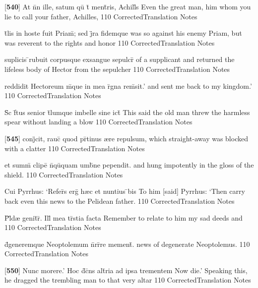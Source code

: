 \latline
  {[\textbf{540}] At n\={}n ille, satum qu\={} t\={} ment\={\macron {\i}}ris, Achill\={}s}
  { Even the great man, him whom you lie to call your father, Achilles, }
  {110}
  { CorrectedTranslation }
  { Notes }


\latline
  {t\={}lis in hoste fuit Priam\={}; sed j\={}ra fidemque}
  { was so against his enemy Priam, but was reverent to the rights and honor }
  {110}
  { CorrectedTranslation }
  { Notes }


\latline
  {suplicis \={}rubuit corpusque exsangue sepulcr\={}}
  { of a supplicant and returned the lifeless body of Hector from the sepulcher }
  {110}
  { CorrectedTranslation }
  { Notes }


\latline
  {reddidit Hectoreum m\={}que in mea r\={}gna rem\={\macron {\i}}sit.'}
  { and sent me back to my kingdom.' }
  {110}
  { CorrectedTranslation }
  { Notes }


\latline
  {S\={\macron {\i}}c f\={}tus senior t\={}lumque imbelle sine ict\={}}
  { This said the old man threw the harmless spear without landing a blow }
  {110}
  { CorrectedTranslation }
  { Notes }


\latline
  {[\textbf{545}] conj\={}cit, rauc\={} quod pr\={}tinus {\ae}re repulsum,}
  { which straight-away was blocked with a clatter  }
  {110}
  { CorrectedTranslation }
  { Notes }


\latline
  {et summ\={} clipe\={\macron {\i}} n\={}qu\={\macron {\i}}quam umb\={}ne pependit.}
  { and hung impotently in the gloss of the shield. }
  {110}
  { CorrectedTranslation }
  { Notes }


\latline
  {Cui Pyrrhus: `Refer\={}s erg\={} h{\ae}c et nuntius \={\macron {\i}}bis}
  { To him [said] Pyrrhus: `Then carry back even this news to the Pelidean father. }
  {110}
  { CorrectedTranslation }
  { Notes }


\latline
  {P\={}l\={\macron {\i}}d{\ae} genit\={}r\={\macron {\i}}.  Ill\={\macron {\i}} mea tr\={\macron {\i}}stia facta}
  { Remember to relate to him my sad deeds and  }
  {110}
  { CorrectedTranslation }
  { Notes }


\latline
  {d\={}generemque Neoptolemum n\={}rr\={}re mement\={}.}
  { news of degenerate Neoptolemus. }
  {110}
  { CorrectedTranslation }
  { Notes }


\latline
  {[\textbf{550}] Nunc morere.'  Hoc d\={\macron {\i}}c\={}ns alt\={}ria ad ipsa trementem}
  { Now die.'  Speaking this, he dragged the trembling man to that very altar }
  {110}
  { CorrectedTranslation }
  { Notes }


